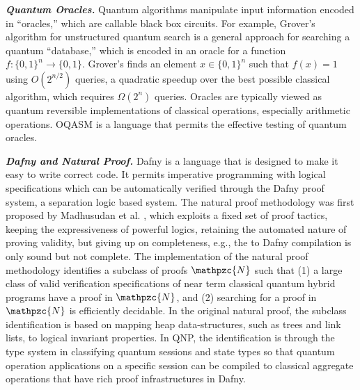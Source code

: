 \noindent\textbf{\textit{Quantum Oracles.}} Quantum algorithms manipulate input information encoded in ``oracles,'' which are callable black box circuits. For example, Grover's algorithm for unstructured quantum search \cite{grover1996,grover1997} is a general approach for searching a quantum ``database,'' which is encoded in an oracle for a function $f : \{0, 1\}^n \to \{0, 1\}$. Grover's finds an element $x \in \{0, 1\}^n$ such that $f(x) = 1$ using $O(2^{n/2})$ queries, a quadratic speedup over the best possible classical algorithm, which requires $\Omega(2^n)$ queries. Oracles are typically viewed as quantum reversible implementations of classical operations, especially arithmetic operations. OQASM \cite{oracleoopsla} is a language that permits the effective testing of quantum oracles.

\noindent\textbf{\textit{Dafny and Natural Proof.}} Dafny \cite{10.1007/978-3-642-17511-4_20} is a language that is designed to make it easy to write correct code. It permits imperative programming with logical specifications which can be automatically verified through the Dafny proof system, a separation logic based system. The natural proof methodology was first proposed by Madhusudan \textsf{et al.} \cite{nat-proof,10.1145/2103621.2103673}, which exploits a fixed set of proof tactics, keeping the expressiveness of powerful logics, retaining the
automated nature of proving validity, but giving up on completeness, e.g., the \qafny to Dafny compilation is only sound but not complete. 
The \qafny implementation of the natural proof methodology identifies a subclass of proofs $\mathpzc{N}$ such that
(1) a large class of valid verification specifications of near term classical quantum hybrid programs have a proof in $\mathpzc{N}$, 
and (2) searching for a proof in $\mathpzc{N}$ is efficiently decidable. 
In the original natural proof, the subclass identification is based on mapping heap data-structures, such as trees and link lists, to logical invariant properties. In QNP, the identification is through the \qafny type system in classifying quantum sessions and state types so that quantum operation applications on a specific session can be compiled to classical aggregate operations that have rich proof infrastructures in Dafny. 










